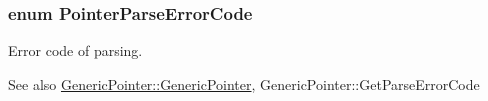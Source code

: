 \subsubsection[{\texorpdfstring{Pointer\+Parse\+Error\+Code}{PointerParseErrorCode}}]{\setlength{\rightskip}{0pt plus 5cm}enum {\bf Pointer\+Parse\+Error\+Code}}\hypertarget{group___r_a_p_i_d_j_s_o_n___e_r_r_o_r_s_gacb2e274f33e54d91b96e9883a99a98be}{}\label{group___r_a_p_i_d_j_s_o_n___e_r_r_o_r_s_gacb2e274f33e54d91b96e9883a99a98be}


Error code of parsing. 

\begin{DoxySeeAlso}{See also}
\hyperlink{class_generic_pointer_a5d85b7dc82719643e8f7adccd5a74fbe}{Generic\+Pointer\+::\+Generic\+Pointer}, Generic\+Pointer\+::\+Get\+Parse\+Error\+Code 
\end{DoxySeeAlso}

